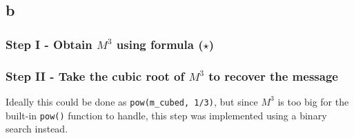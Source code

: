 \documentclass[12pt]{article}
\begin{document}
\subsection*{b}
\subsubsection*{Step I - Obtain $M^3$ using formula ($\star$)}
\subsubsection*{Step II - Take the cubic root of $M^3$ to recover the message} Ideally this could be done as \verb|pow(m_cubed, 1/3)|, but since $M^3$ is too big for the built-in \verb|pow()| function to handle, this step was implemented using a binary search instead.
\end{document}
